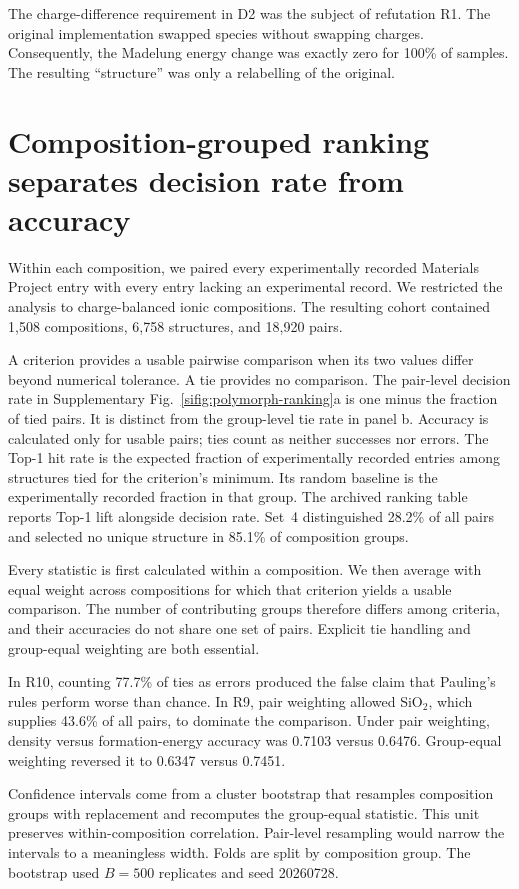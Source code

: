 The charge-difference requirement in D2 was the subject of refutation R1. The
original implementation swapped species without swapping charges. Consequently,
the Madelung energy change was exactly zero for 100\% of samples. The resulting
``structure'' was only a relabelling of the original.

\section{Composition-grouped ranking separates decision rate from accuracy}\label{note:s13}

Within each composition, we paired every experimentally recorded Materials
Project entry with every entry lacking an experimental record. We restricted the
analysis to charge-balanced ionic compositions. The resulting cohort contained
1{,}508 compositions, 6{,}758 structures, and 18{,}920 pairs.

A criterion provides a usable pairwise comparison when its two values differ
beyond numerical tolerance. A tie provides no comparison. The pair-level decision
rate in Supplementary Fig.~\ref{sifig:polymorph-ranking}a is one minus the
fraction of tied pairs. It is distinct from the group-level tie rate in panel b.
Accuracy is calculated only for usable pairs; ties count as neither successes nor
errors. The Top-1 hit rate is the expected fraction of experimentally recorded
entries among structures tied for the criterion's minimum. Its random baseline
is the experimentally recorded fraction in that group. The archived ranking
table reports Top-1 lift alongside decision rate. Set~4 distinguished 28.2\% of
all pairs and selected no unique structure in 85.1\% of composition groups.

Every statistic is first calculated within a composition. We then average with
equal weight across compositions for which that criterion yields a usable
comparison. The number of contributing groups therefore differs among criteria,
and their accuracies do not share one set of pairs. Explicit tie handling and
group-equal weighting are both essential.

In R10, counting 77.7\% of ties as errors produced the false claim that
Pauling's rules perform worse than chance. In R9, pair weighting allowed
SiO$_2$, which supplies 43.6\% of all pairs, to dominate the comparison. Under
pair weighting, density versus formation-energy accuracy was 0.7103 versus
0.6476. Group-equal weighting reversed it to 0.6347 versus 0.7451.

Confidence intervals come from a cluster bootstrap that resamples composition
groups with replacement and recomputes the group-equal statistic. This unit
preserves within-composition correlation. Pair-level resampling would narrow the
intervals to a meaningless width. Folds are split by composition group. The
bootstrap used $B=500$ replicates and seed 20260728.

